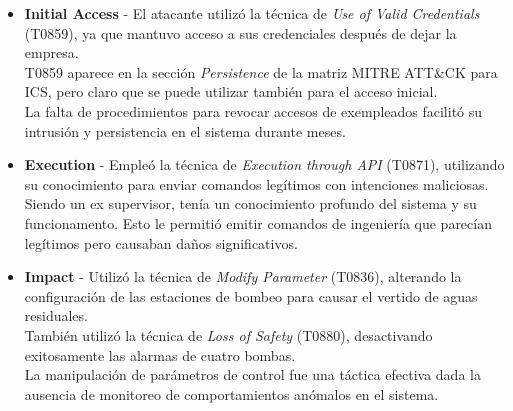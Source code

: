 \begin{itemize}
    \item \textbf{Initial Access} - El atacante utilizó la técnica de \textit{Use of Valid Credentials} (T0859), ya que mantuvo acceso a sus credenciales después de dejar la empresa.\\
    T0859 aparece en la sección \textit{Persistence} de la matriz MITRE ATT\&CK para ICS, pero claro que se puede utilizar también para el acceso inicial.\\
    La falta de procedimientos para revocar accesos de exempleados facilitó su intrusión y persistencia en el sistema durante meses.
    
    
    \item \textbf{Execution} - Empleó la técnica de \textit{Execution through API} (T0871), utilizando su conocimiento para enviar comandos legítimos con intenciones maliciosas.\\
    Siendo un ex supervisor, tenía un conocimiento profundo del sistema y su funcionamento. Esto le permitió emitir comandos de ingeniería que parecían legítimos pero causaban daños significativos.
    
    \item \textbf{Impact} - Utilizó la técnica de \textit{Modify Parameter} (T0836), alterando la configuración de las estaciones de bombeo para causar el vertido de aguas residuales.\\
    También utilizó la técnica de \textit{Loss of Safety} (T0880), desactivando exitosamente las alarmas de cuatro bombas.\\
    La manipulación de parámetros de control fue una táctica efectiva dada la ausencia de monitoreo de comportamientos anómalos en el sistema.
\end{itemize}


    
    
